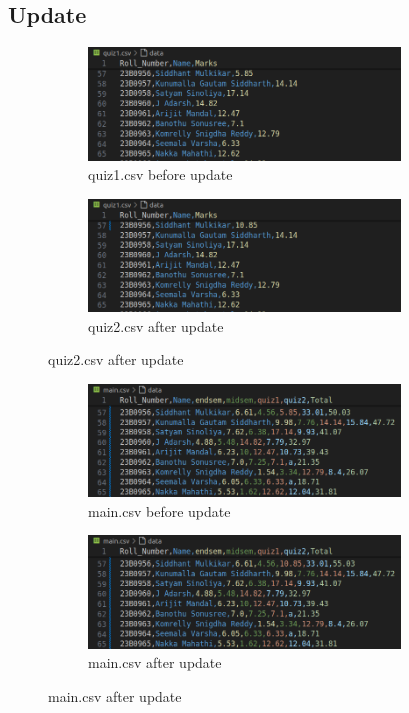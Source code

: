 \documentclass{article}
\begin{document}
\subsection{Update}
\begin{figure}[h]
    \begin{subfigure}{0.5\textwidth}
    \includegraphics[width=\linewidth, height=3cm]{quiz-before.png} 
    \caption{quiz1.csv before update}
    \end{subfigure}
    \begin{subfigure}{0.5\textwidth}
    \includegraphics[width=\linewidth, height=3cm]{quiz-after.png}
    \caption{quiz2.csv after update}
    \end{subfigure}
\end{figure}
\begin{figure}[h]
    \begin{subfigure}{0.5\textwidth}
    \includegraphics[width=\linewidth, height=3cm]{main-before.png} 
    \caption{main.csv before update}
    \end{subfigure}
    \begin{subfigure}{0.5\textwidth}
    \includegraphics[width=\linewidth, height=3cm]{main-after.png}
    \caption{main.csv after update}
    \end{subfigure}
\end{figure}
\end{document}
